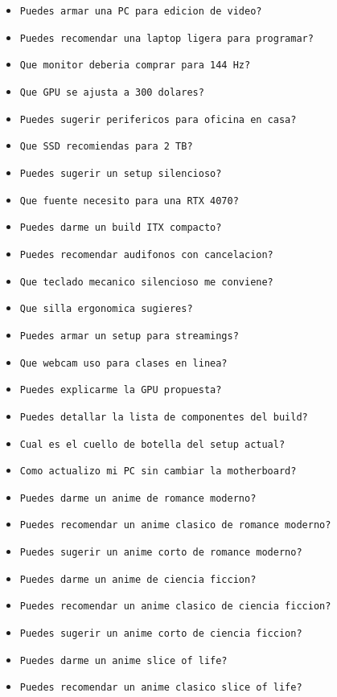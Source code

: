 \documentclass[a4paper,12pt]{article}
\begin{document}
\begin{itemize}
    \item \texttt{Puedes armar una PC para edicion de video?}
    \item \texttt{Puedes recomendar una laptop ligera para programar?}
    \item \texttt{Que monitor deberia comprar para 144 Hz?}
    \item \texttt{Que GPU se ajusta a 300 dolares?}
    \item \texttt{Puedes sugerir perifericos para oficina en casa?}
    \item \texttt{Que SSD recomiendas para 2 TB?}
    \item \texttt{Puedes sugerir un setup silencioso?}
    \item \texttt{Que fuente necesito para una RTX 4070?}
    \item \texttt{Puedes darme un build ITX compacto?}
    \item \texttt{Puedes recomendar audifonos con cancelacion?}
    \item \texttt{Que teclado mecanico silencioso me conviene?}
    \item \texttt{Que silla ergonomica sugieres?}
    \item \texttt{Puedes armar un setup para streamings?}
    \item \texttt{Que webcam uso para clases en linea?}
    \item \texttt{Puedes explicarme la GPU propuesta?}
    \item \texttt{Puedes detallar la lista de componentes del build?}
    \item \texttt{Cual es el cuello de botella del setup actual?}
    \item \texttt{Como actualizo mi PC sin cambiar la motherboard?}
    \item \texttt{Puedes darme un anime de romance moderno?}
    \item \texttt{Puedes recomendar un anime clasico de romance moderno?}
    \item \texttt{Puedes sugerir un anime corto de romance moderno?}
    \item \texttt{Puedes darme un anime de ciencia ficcion?}
    \item \texttt{Puedes recomendar un anime clasico de ciencia ficcion?}
    \item \texttt{Puedes sugerir un anime corto de ciencia ficcion?}
    \item \texttt{Puedes darme un anime slice of life?}
    \item \texttt{Puedes recomendar un anime clasico slice of life?}

\end{itemize}
\end{document}
